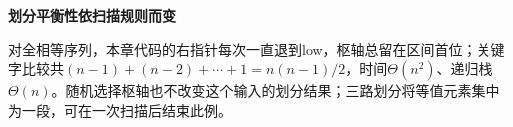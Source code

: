 {\color{ink}\bfseries 划分平衡性依扫描规则而变}\par\vspace{1bp}对全相等序列，本章代码的右指针每次一直退到low，枢轴总留在区间首位；关键字比较共\((n-1)+\allowbreak{}(n-2)+\allowbreak{}\cdots +\allowbreak{}1=\allowbreak{}n(n-1)/\allowbreak{}2\)，时间\(\Theta (n^{2})\)、递归栈\(\Theta (n)\)。随机选择枢轴也不改变这个输入的划分结果；三路划分将等值元素集中为一段，可在一次扫描后结束此例。
